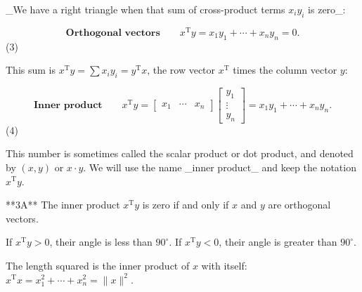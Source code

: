 _We have a right triangle when that sum of cross-product terms \(x_{i}y_{i}\) is zero_:

\[\textbf{Orthogonal vectors}\qquad x^{\mathrm{T}}y=x_{1}y_{1}+\cdots+x_{n}y_{n}=0.\] (3)

This sum is \(x^{\mathrm{T}}y=\sum x_{i}y_{i}=y^{\mathrm{T}}x\), the row vector \(x^{\mathrm{T}}\) times the column vector \(y\):

\[\textbf{Inner product}\qquad x^{\mathrm{T}}y=\begin{bmatrix}x_{1}&\cdots&x_{n} \end{bmatrix}\begin{bmatrix}y_{1}\\ \vdots\\ y_{n}\end{bmatrix}=x_{1}y_{1}+\cdots+x_{n}y_{n}.\] (4)

This number is sometimes called the scalar product or dot product, and denoted by \((x,y)\) or \(x\cdot y\). We will use the name _inner product_ and keep the notation \(x^{\mathrm{T}}y\).

**3A** The inner product \(x^{\mathrm{T}}y\) is zero if and only if \(x\) and \(y\) are orthogonal vectors.

If \(x^{\mathrm{T}}y>0\), their angle is less than \(90^{\circ}\). If \(x^{\mathrm{T}}y<0\), their angle is greater than \(90^{\circ}\).

The length squared is the inner product of \(x\) with itself: \(x^{\mathrm{T}}x=x_{1}^{2}+\cdots+x_{n}^{2}=\|x\|^{2}\).

 